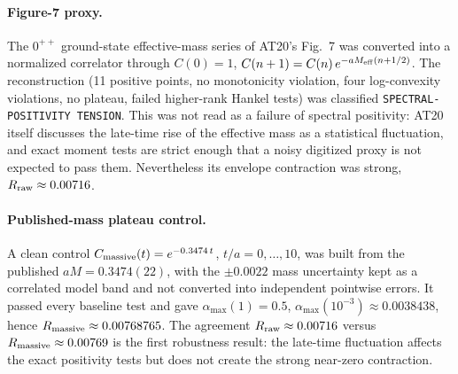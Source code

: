 \documentclass[11pt,a4paper]{article}
\theoremstyle{definition}
\theoremstyle{remark}
\begin{document}
\paragraph{Figure-7 proxy.} The $0^{++}$ ground-state effective-mass series of AT20's Fig.~7 was converted into a normalized correlator through $C(0)=1$, $C(n+1)=C(n)\,e^{-aM_{\rm eff}(n+1/2)}$. The reconstruction (11 positive points, no monotonicity violation, four log-convexity violations, no plateau, failed higher-rank Hankel tests) was classified \texttt{SPECTRAL-\allowbreak{}POSITIVITY TENSION}. This was not read as a failure of spectral positivity: AT20 itself discusses the late-time rise of the effective mass as a statistical fluctuation, and exact moment tests are strict enough that a noisy digitized proxy is not expected to pass them. Nevertheless its envelope contraction was strong, $R_{\rm raw}\approx0.00716$.

\paragraph{Published-mass plateau control.} A clean control $C_{\rm massive}(t)=e^{-0.3474\,t}$, $t/a=0,\dots,10$, was built from the published $aM=0.3474(22)$, with the $\pm0.0022$ mass uncertainty kept as a correlated model band and not converted into independent pointwise errors. It passed every baseline test and gave $\alpha_{\max}(1)=0.5$, $\alpha_{\max}(10^{-3})\approx0.0038438$, hence $R_{\rm massive}\approx0.00768765$. The agreement $R_{\rm raw}\approx0.00716$ versus $R_{\rm massive}\approx0.00769$ is the first robustness result: the late-time fluctuation affects the exact positivity tests but does not create the strong near-zero contraction.
\end{document}
